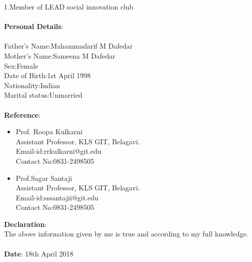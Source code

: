 \documentclass{article}
\begin{document}
1.Member of LEAD social innovation club \\~\\
\textbf{Personal Details}:\\~\\
Father's Name:Mahammadarif  M Dafedar\\
Mother's Name:Sameena M Dafedar\\
Sex:Female\\
Date of Birth:1st April 1998\\
Nationality:Indian\\
Marital status:Unmarried\\~\\
\textbf{Reference}:\\
\begin{itemize}
\item Prof. Roopa Kulkarni \\ Assistant Professor, KLS GIT, Belagavi.\\Email-id:rrkulkarni@git.edu\\ Contact No:0831-2498505
\item Prof.Sagar Santaji \\ Assistant Professor, KLS GIT, Belagavi.\\Email-id:sssantajii@git.edu\\ Contact No:0831-2498505\\
\end{itemize}
\textbf{Declaration}:\\
The above information given by me is true and according to my full knowledge.\\~\\
\textbf{Date}:
18th April 2018
\end{document}
